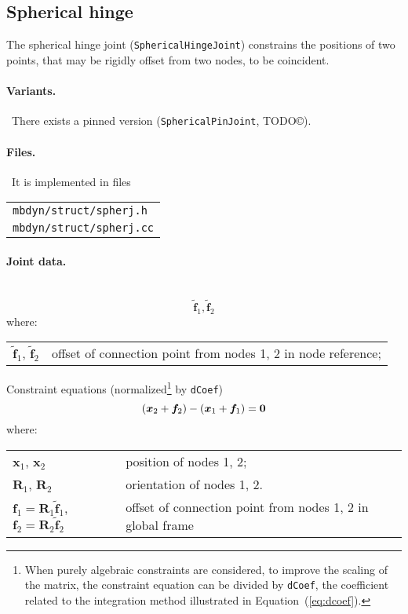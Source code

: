 \documentclass[10pt,dvips,fleqn,subeqn]{report}
\newcommand{\T}[1]{\bm{#1}}
\begin{document}
\subsection{Spherical hinge}
The spherical hinge joint (\texttt{SphericalHingeJoint}) constrains the positions
of two points, that may be rigidly offset from two nodes, to be coincident.

\paragraph{Variants.} \
There exists a pinned version (\texttt{SphericalPinJoint}, TODO\copyright).

\paragraph{Files.} \
It is implemented in files

\begin{tabular}{l}
\texttt{mbdyn/struct/spherj.h} \\
\texttt{mbdyn/struct/spherj.cc}
\end{tabular}

\paragraph{Joint data.} \
\begin{equation}
	\tilde{\T{f}}_1, \tilde{\T{f}}_2
\end{equation}
where:

\noindent
\begin{tabular}{ll}
$\tilde{\T{f}}_1$, $\tilde{\T{f}}_2$ & offset of connection point from nodes 1, 2 in node reference; \\
\end{tabular}

\noindent
Constraint equations (normalized\footnote{When purely algebraic
constraints are considered, to improve the scaling of the matrix,
the constraint equation can be divided by \texttt{dCoef},
the coefficient related to the integration method illustrated 
in Equation~(\ref{eq:dcoef}).
} by \texttt{dCoef})
\begin{equation}
	\plbr{\T{x}_2 + \T{f}_2} - \plbr{\T{x}_1 + \T{f}_1} = \T{0}
\end{equation}
where:

\noindent
\begin{tabular}{ll}
$\T{x}_1$, $\T{x}_2$ & position of nodes 1, 2; \\
$\T{R}_1$, $\T{R}_2$ & orientation of nodes 1, 2.\\
$\T{f}_1 = \T{R}_1 \tilde{\T{f}}_1$, $\T{f}_2 = \T{R}_2 \tilde{\T{f}}_2$ & offset of connection point from nodes 1, 2 in global frame
\end{tabular}
\end{document}

